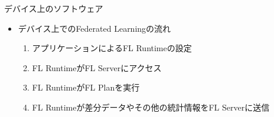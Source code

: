 \documentclass[dvipdfmx,notheorems,t]{beamer}
\begin{document}
\begin{frame}{デバイス上のソフトウェア}

\begin{itemize}
	\item デバイス上でのFederated Learningの流れ
	\begin{enumerate}
		\item アプリケーションによるFL Runtimeの設定
		\newline
		\item FL RuntimeがFL Serverにアクセス
		\newline
		\item FL RuntimeがFL Planを実行
		\newline
		\item FL Runtimeが差分データやその他の統計情報をFL Serverに送信
	\end{enumerate}
\end{itemize}

\end{frame}
\end{document}
